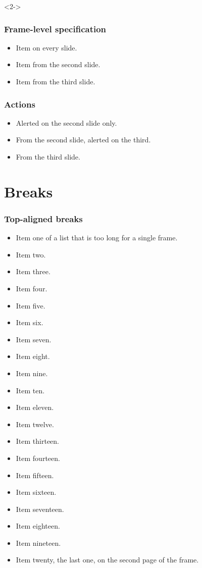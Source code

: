 \documentclass{beamer}
\begin{document}
\begin{frame}<2->
  \frametitle{Frame-level specification}
  \begin{itemize}
    \item<1-> Item on every slide.
    \item<2-> Item from the second slide.
    \item<3-> Item from the third slide.
  \end{itemize}
\end{frame}

\begin{frame}
  \frametitle{Actions}
  \begin{itemize}
    \item<1-| alert@2> Alerted on the second slide only.
    \item<2-| alert@3> From the second slide, alerted on the third.
    \item<3-> From the third slide.
  \end{itemize}
\end{frame}

\section{Breaks}

\begin{frame}[t,allowframebreaks]
  \frametitle{Top-aligned breaks}
  \begin{itemize}
    \item Item one of a list that is too long for a single frame.
    \item Item two.
    \item Item three.
    \item Item four.
    \item Item five.
    \item Item six.
    \item Item seven.
    \item Item eight.
    \item Item nine.
    \item Item ten.
    \item Item eleven.
    \item Item twelve.
    \item Item thirteen.
    \item Item fourteen.
    \item Item fifteen.
    \item Item sixteen.
    \item Item seventeen.
    \item Item eighteen.
    \item Item nineteen.
    \item Item twenty, the last one, on the second page of the frame.
  \end{itemize}
\end{frame}
\end{document}
